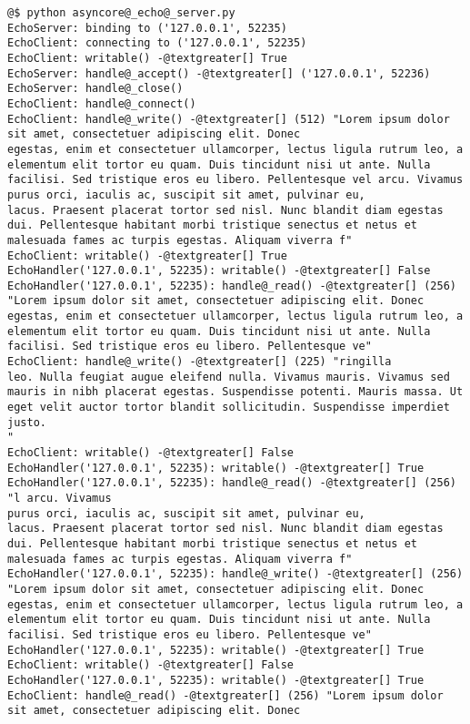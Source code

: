 \documentclass[a4paper,10pt,english]{manual}
\begin{document}
\begin{Verbatim}[commandchars=@\[\]]
@$ python asyncore@_echo@_server.py
EchoServer: binding to ('127.0.0.1', 52235)
EchoClient: connecting to ('127.0.0.1', 52235)
EchoClient: writable() -@textgreater[] True
EchoServer: handle@_accept() -@textgreater[] ('127.0.0.1', 52236)
EchoServer: handle@_close()
EchoClient: handle@_connect()
EchoClient: handle@_write() -@textgreater[] (512) "Lorem ipsum dolor sit amet, consectetuer adipiscing elit. Donec
egestas, enim et consectetuer ullamcorper, lectus ligula rutrum leo, a
elementum elit tortor eu quam. Duis tincidunt nisi ut ante. Nulla
facilisi. Sed tristique eros eu libero. Pellentesque vel arcu. Vivamus
purus orci, iaculis ac, suscipit sit amet, pulvinar eu,
lacus. Praesent placerat tortor sed nisl. Nunc blandit diam egestas
dui. Pellentesque habitant morbi tristique senectus et netus et
malesuada fames ac turpis egestas. Aliquam viverra f"
EchoClient: writable() -@textgreater[] True
EchoHandler('127.0.0.1', 52235): writable() -@textgreater[] False
EchoHandler('127.0.0.1', 52235): handle@_read() -@textgreater[] (256) "Lorem ipsum dolor sit amet, consectetuer adipiscing elit. Donec
egestas, enim et consectetuer ullamcorper, lectus ligula rutrum leo, a
elementum elit tortor eu quam. Duis tincidunt nisi ut ante. Nulla
facilisi. Sed tristique eros eu libero. Pellentesque ve"
EchoClient: handle@_write() -@textgreater[] (225) "ringilla
leo. Nulla feugiat augue eleifend nulla. Vivamus mauris. Vivamus sed
mauris in nibh placerat egestas. Suspendisse potenti. Mauris massa. Ut
eget velit auctor tortor blandit sollicitudin. Suspendisse imperdiet
justo.
"
EchoClient: writable() -@textgreater[] False
EchoHandler('127.0.0.1', 52235): writable() -@textgreater[] True
EchoHandler('127.0.0.1', 52235): handle@_read() -@textgreater[] (256) "l arcu. Vivamus
purus orci, iaculis ac, suscipit sit amet, pulvinar eu,
lacus. Praesent placerat tortor sed nisl. Nunc blandit diam egestas
dui. Pellentesque habitant morbi tristique senectus et netus et
malesuada fames ac turpis egestas. Aliquam viverra f"
EchoHandler('127.0.0.1', 52235): handle@_write() -@textgreater[] (256) "Lorem ipsum dolor sit amet, consectetuer adipiscing elit. Donec
egestas, enim et consectetuer ullamcorper, lectus ligula rutrum leo, a
elementum elit tortor eu quam. Duis tincidunt nisi ut ante. Nulla
facilisi. Sed tristique eros eu libero. Pellentesque ve"
EchoHandler('127.0.0.1', 52235): writable() -@textgreater[] True
EchoClient: writable() -@textgreater[] False
EchoHandler('127.0.0.1', 52235): writable() -@textgreater[] True
EchoClient: handle@_read() -@textgreater[] (256) "Lorem ipsum dolor sit amet, consectetuer adipiscing elit. Donec

\end{Verbatim}
\end{document}

